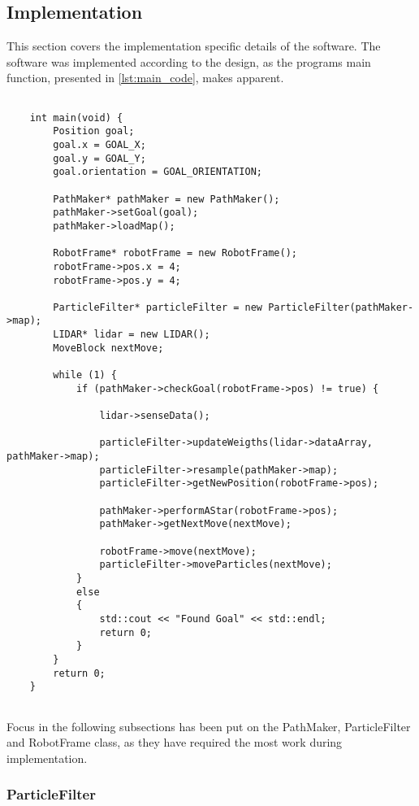 \documentclass[Main]{subfiles}
\begin{document}
	
	\subsection{Implementation} %
	\label{sub:software_implementation}
	
	This section covers the implementation specific details of the software.
	The software was implemented according to the design, as the programs main function, presented in \autoref{lst:main_code}, makes apparent.

	\begin{lstlisting}[caption=Main Function of Progam, style=Code-C++, label=lst:main_code, basicstyle=\scriptsize]
	
	int main(void) {
		Position goal;
		goal.x = GOAL_X;
		goal.y = GOAL_Y;
		goal.orientation = GOAL_ORIENTATION;
	
		PathMaker* pathMaker = new PathMaker();
		pathMaker->setGoal(goal);
		pathMaker->loadMap();
	
		RobotFrame* robotFrame = new RobotFrame();
		robotFrame->pos.x = 4;
		robotFrame->pos.y = 4;
	
		ParticleFilter* particleFilter = new ParticleFilter(pathMaker->map);
		LIDAR* lidar = new LIDAR();
		MoveBlock nextMove;
	
		while (1) {
			if (pathMaker->checkGoal(robotFrame->pos) != true) {
				
				lidar->senseData();
				
				particleFilter->updateWeigths(lidar->dataArray, pathMaker->map);
				particleFilter->resample(pathMaker->map);
				particleFilter->getNewPosition(robotFrame->pos);
				
				pathMaker->performAStar(robotFrame->pos);
				pathMaker->getNextMove(nextMove);
				
				robotFrame->move(nextMove);
				particleFilter->moveParticles(nextMove);
			}
			else
			{
				std::cout << "Found Goal" << std::endl;
				return 0;
			}
		}
		return 0;
	}
	
	\end{lstlisting}

	Focus in the following subsections has been put on the PathMaker, ParticleFilter and RobotFrame class, as they have required the most work during implementation.
	
	\subsubsection{ParticleFilter} %
	\label{subsub:software_particlefilter}
	
\end{document}
